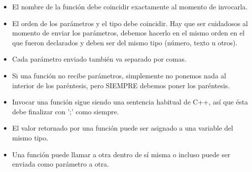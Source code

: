 \begin{itemize}
	\item El nombre de la función debe coincidir exactamente al momento de invocarla.
	\item El orden de los parámetros y el tipo debe coincidir. Hay que ser cuidadosos al momento de enviar los parámetros, debemos hacerlo en el mismo orden en el que fueron declarados y deben ser del mismo tipo (número, texto u otros).
	\item Cada parámetro enviado también va separado por comas.
	\item Si una función no recibe parámetros, simplemente no ponemos nada al interior de los paréntesis, pero SIEMPRE debemos poner los paréntesis.
	\item Invocar una función sigue siendo una sentencia habitual de C++, así que ésta debe finalizar con ';' como siempre.
	\item El valor retornado por una función puede ser asignado a una variable del mismo tipo.
	\item Una función puede llamar a otra dentro de sí misma o incluso puede ser enviada como parámetro a otra.
\end{itemize}



